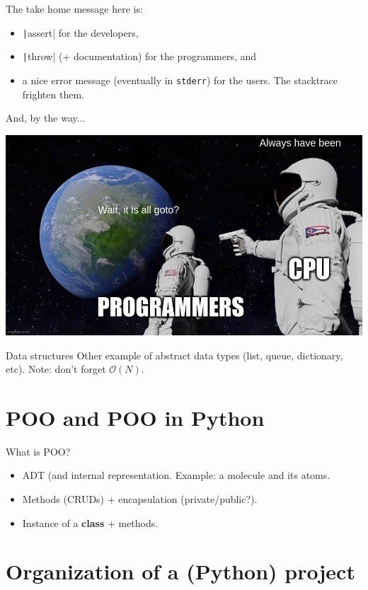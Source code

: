 \documentclass[10pt,
aspectratio=169
]{beamer}
\begin{document}
\begin{frame}
	The take home message here is:\begin{itemize}
		\item \texttt|assert| for the developers,
		\item \texttt|throw| (+ documentation) for the programmers, and
		\item a nice error message (eventually in \texttt{stderr}) for the users. The stacktrace frighten them.
	\end{itemize}
	
	
	And, by the way...
	
	\begin{center}
		\includegraphics[width=.5\linewidth]{im/meme-goto}
	\end{center}
\end{frame}

\begin{frame}{Data structures}
Other example of abstract data types (list, queue, dictionary, etc).
Note: don't forget $\mathcal O(N)$.
\end{frame}

 \section{POO and POO in Python}
 
 \begin{frame}{What is POO?}
 	\begin{itemize}
 		\item ADT (and internal representation. Example: a molecule and its atoms.
 		\item Methods (CRUDs)  + encapsulation (private/public?).
 		\item Instance of a \textbf{class} + methods.
 	\end{itemize}
 \end{frame}
 
 \section{Organization of a (Python) project}
 
\end{document}
